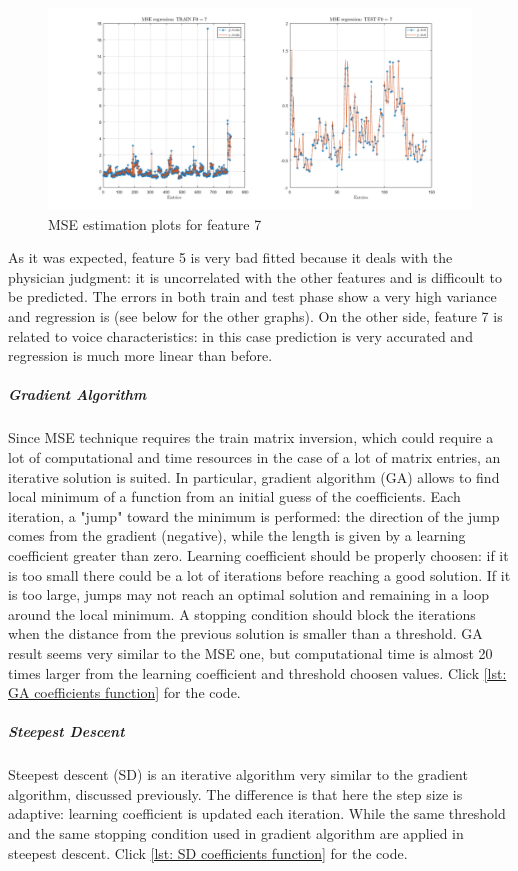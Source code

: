 \documentclass{article}
\begin{document}
\begin{figure}[H]
	\centering
	\includegraphics[scale=0.3]{pictures/MSE_F7_2.png}
	\caption{MSE estimation plots for feature 7}\label{fig:MSE_F7}
\end{figure}

As it was expected, feature 5 is very bad fitted because it deals with the physician judgment: it is uncorrelated with the other features and is difficoult to be predicted. The errors in both train and test phase show a very high variance and regression is (see below for the other graphs). On the other side, feature 7 is related to voice characteristics: in this case prediction is very accurated and  regression is much more linear than before. 

\subparagraph{Gradient Algorithm}
Since MSE technique requires the train matrix inversion, which could require a lot of computational and time resources in the case of a lot of matrix entries, an iterative solution is suited. In particular, gradient algorithm (GA) allows to find local minimum of a function from an initial guess of the coefficients. Each iteration, a "jump" toward the minimum is performed: the direction of the jump comes from the gradient (negative), while the length is given by a learning coefficient greater than zero. Learning coefficient should be properly choosen: if it is too small there could be a lot of iterations before reaching a good solution. If it is too large, jumps may not reach an optimal solution and remaining in a loop around the local minimum.
A stopping condition should block the iterations when the distance from the previous solution is smaller than a threshold. 
GA result seems very similar to the MSE one, but computational time is almost 20 times larger from the learning coefficient and threshold choosen values. Click \ref{lst: GA coefficients function} for the code.

\subparagraph{Steepest Descent}
Steepest descent (SD) is an iterative algorithm very similar to the gradient algorithm, discussed previously. The difference is that here the step size is adaptive: learning coefficient is updated each iteration. While the same threshold and the same stopping condition used in gradient algorithm are applied in steepest descent. Click \ref{lst: SD coefficients function} for the code.
\end{document}
